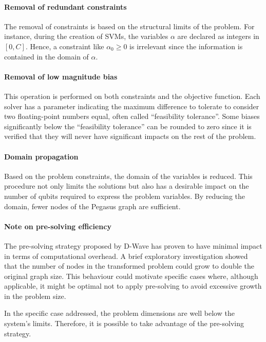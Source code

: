 \paragraph{Removal of redundant constraints} The removal of constraints is based on the structural limits of the problem. For instance, during the creation of SVMs, the variables $\alpha$ are declared as integers in $[0, C]$. Hence, a constraint like $\alpha_0 \geq 0$ is irrelevant since the information is contained in the domain of $\alpha$.

\paragraph{Removal of low magnitude bias} This operation is performed on both constraints and the objective function. Each solver has a parameter indicating the maximum difference to tolerate to consider two floating-point numbers equal, often called ``feasibility tolerance''. Some biases significantly below the ``feasibility tolerance'' can be rounded to zero since it is verified that they will never have significant impacts on the rest of the problem.

\paragraph{Domain propagation} Based on the problem constraints, the domain of the variables is reduced. This procedure not only limits the solutions but also has a desirable impact on the number of qubits required to express the problem variables. By reducing the domain, fewer nodes of the Pegasus graph are sufficient.

\paragraph{Note on pre-solving efficiency} The pre-solving strategy proposed by D-Wave has proven to have minimal impact in terms of computational overhead. A brief exploratory investigation showed that the number of nodes in the transformed problem could grow to double the original graph size. This behaviour could motivate specific cases where, although applicable, it might be optimal not to apply pre-solving to avoid excessive growth in the problem size.

In the specific case addressed, the problem dimensions are well below the system’s limits\cite{hybrid2}. Therefore, it is possible to take advantage of the pre-solving strategy.
